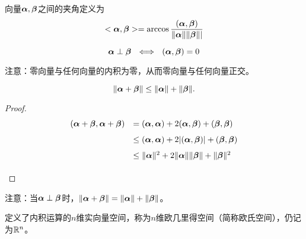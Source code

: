 \begin{dingyi}[向量之间的夹角] 
  向量$\alphabd,\betabd$之间的夹角定义为
  $$
  <\alphabd,\betabd>=\arccos\frac{(\alphabd,\betabd)}{\|\alphabd\|\|\betabd\||}
  $$
\end{dingyi}

\begin{dingli}
  $$\alphabd\perp\betabd ~~\Longleftrightarrow~~
  (\alphabd,\betabd)=0
  $$
\end{dingli}

注意：零向量与任何向量的内积为零，从而零向量与任何向量正交。







\begin{dingli}[三角不等式] 
  $$
  \|\alphabd+\betabd\|\le\|\alphabd\|+\|\betabd\|.
  $$
\end{dingli}
\begin{proof}
	$$
	\begin{array}{rl}
	(\alphabd+\betabd,\alphabd+\betabd)
	&= (\alphabd,\alphabd)+2(\alphabd,\betabd)+(\betabd,\betabd)\\[0.1in]
	&\le (\alphabd,\alphabd)+2|(\alphabd,\betabd)|+(\betabd,\betabd) \\[0.1in]
	&\le \|\alphabd\|^2+2\|\alphabd\|\|\betabd\|+\|\betabd\|^2 \\[0.1in]
	\end{array}
	$$
\end{proof}



注意：当$\alphabd\perp\betabd$时，$\|\alphabd+\betabd\|=\|\alphabd\|+\|\betabd\|$。






\begin{dingyi}[欧几里得空间]
  定义了内积运算的$n$维实向量空间，称为$n$维欧几里得空间（简称欧氏空间），仍记为$\R^n$。
\end{dingyi}





























